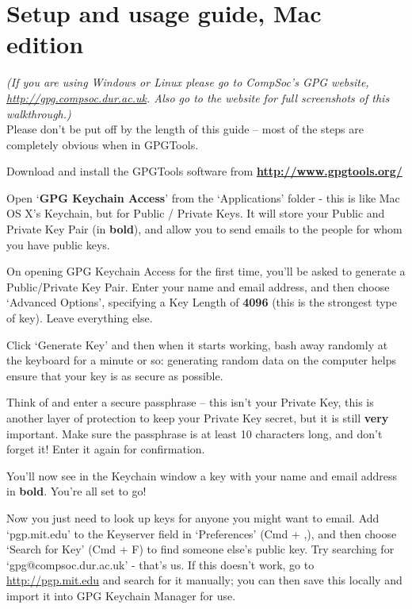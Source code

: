 \section{Setup and usage guide, Mac edition}
\textit{(If you are using Windows or Linux please go to CompSoc's GPG website, \href{http://gpg.compsoc.dur.ac.uk}{http://gpg.compsoc.dur.ac.uk}. Also go to the website for full screenshots of this walkthrough.)} \\
Please don't be put off by the length of this guide -- most of the steps are completely obvious when in GPGTools.
\begin{compactenum}[1.]%
  \item Download and install the GPGTools software from \textbf{\href{http://www.gpgtools.org/}{http://www.gpgtools.org/}}
  \item Open `\textbf{GPG Keychain Access}' from the `Applications' folder - this is like Mac OS X's Keychain, but for Public / Private Keys. It will store your Public and Private Key Pair (in \textbf{bold}), and allow you to send emails to the people for whom you have public keys.
  \item On opening GPG Keychain Access for the first time, you'll be asked to generate a Public/Private Key Pair. Enter your name and email address, and then choose `Advanced Options', specifying a Key Length of \textbf{4096} (this is the strongest type of key). Leave everything else.
  \item Click `Generate Key' and then when it starts working, bash away randomly at the keyboard for a minute or so: generating random data on the computer helps ensure that your key is as secure as possible.
  \item Think of and enter a secure passphrase -- this isn't your Private Key, this is another layer of protection to keep your Private Key secret, but it is still \textbf{very} important. Make sure the passphrase is at least 10 characters long, and don't forget it! Enter it again for confirmation.
  \item You'll now see in the Keychain window a key with your name and email address in \textbf{bold}. You're all set to go! 
  \item Now you just need to look up keys for anyone you might want to email. Add `pgp.mit.edu' to the Keyserver field in `Preferences' (Cmd + ,), and then choose `Search for Key' (Cmd + F) to find someone else's public key. Try searching for `gpg@compsoc.dur.ac.uk' - that's us. If this doesn't work, go to \href{http://pgp.mit.edu}{http://pgp.mit.edu} and search for it manually; you can then save this locally and import it into GPG Keychain Manager for use.

\end{compactenum}
